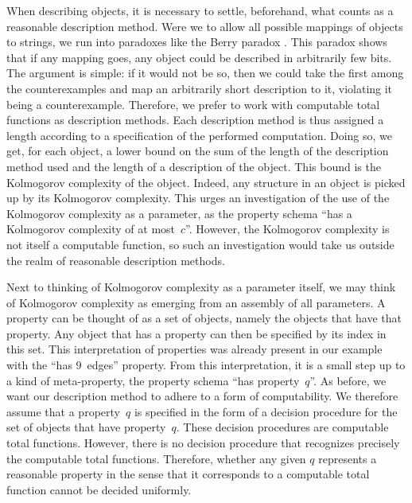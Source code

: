 When describing objects, it is necessary to settle, beforehand, what counts as a reasonable description method.
Were we to allow all possible mappings of objects to strings, we run into paradoxes like the Berry paradox \parencite[see][]{li2008introduction}.
This paradox shows that if any mapping goes, any object could be described in arbitrarily few bits.
The argument is simple: if it would not be so, then we could take the first among the counterexamples and map an arbitrarily short description to it, violating it being a counterexample.
Therefore, we prefer to work with computable total functions as description methods.
Each description method is thus assigned a length according to a specification of the performed computation.
Doing so, we get, for each object, a lower bound on the sum of the length of the description method used and the length of a description of the object.
This bound is the Kolmogorov complexity of the object.
Indeed, any structure in an object is picked up by its Kolmogorov complexity.
This urges an investigation of the use of the Kolmogorov complexity as a parameter, as the property schema \enquote{has a Kolmogorov complexity of at most~$c$}.
However, the Kolmogorov complexity is not itself a computable function, so such an investigation would take us outside the realm of reasonable description methods.

Next to thinking of Kolmogorov complexity as a parameter itself, we may think of Kolmogorov complexity as emerging from an assembly of all parameters.
A property can be thought of as a set of objects, namely the objects that have that property.
Any object that has a property can then be specified by its index in this set.
This interpretation of properties was already present in our example with the \enquote{has $9$~edges} property.
From this interpretation, it is a small step up to a kind of meta-property, the property schema \enquote{has property~$q$}.
As before, we want our description method to adhere to a form of computability.
We therefore assume that a property~$q$ is specified in the form of a decision procedure for the set of objects that have property~$q$.
These decision procedures are computable total functions.
However, there is no decision procedure that recognizes precisely the computable total functions.
Therefore, whether any given $q$ represents a reasonable property in the sense that it corresponds to a computable total function cannot be decided uniformly.

